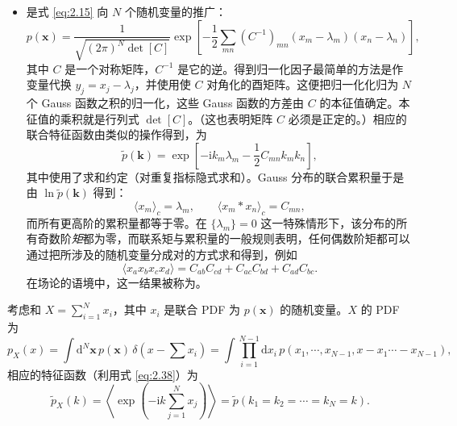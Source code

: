 \begin{itemize}[itemsep=0.45em,topsep=0.4em]
  \item {}是式 \eqref{eq:2.15} 向 $N$ 个随机变量的推广：
  \begin{equation}\label{eq:2.41}
    p(\bm{x})=\frac{1}{\sqrt{(2\pi)^N\det[C]}}\exp\left[-\frac{1}{2}\sum_{mn}\left(C^{-1}\right)_{mn}(x_m-\lambda_m)(x_n-\lambda_n)\right],
  \end{equation}
  其中 $C$ 是一个对称矩阵，$C^{-1}$ 是它的逆。得到归一化因子最简单的方法是作变量代换 $y_j=x_j-\lambda_j$，并使用使 $C$ 对角化的酉矩阵。这便把归一化化归为 $N$ 个 Gauss 函数之积的归一化，这些 Gauss 函数的方差由 $C$ 的本征值确定。本征值的乘积就是行列式 $\det[C]$。（这也表明矩阵 $C$ 必须是正定的。）相应的联合特征函数由类似的操作得到，为
  \begin{equation}\label{eq:2.42}
    \tilde p(\bm{k})=\exp\left[-\mathrm{i}k_m\lambda_m-\frac{1}{2}C_{mn}k_mk_n\right],
  \end{equation}
  其中使用了求和约定（对重复指标隐式求和）。Gauss 分布的联合累积量于是由 $\ln\tilde p(\bm{k})$ 得到：
  \begin{equation}\label{eq:2.43}
    \langle x_m\rangle_c=\lambda_m,\qquad \langle x_m*x_n\rangle_c=C_{mn},
  \end{equation}
  而所有更高阶的累积量都等于零。在 $\{\lambda_m\}=0$ 这一特殊情形下，该分布的所有奇数阶\emph{矩}都为零，而联系矩与累积量的一般规则表明，任何偶数阶矩都可以通过把所涉及的随机变量分成对的方式求和得到，例如
  \begin{equation}\label{eq:2.44}
    \langle x_ax_bx_cx_d\rangle=C_{ab}C_{cd}+C_{ac}C_{bd}+C_{ad}C_{bc}.
  \end{equation}
  在场论的语境中，这一结果被称为。
\end{itemize}


考虑和 $X=\sum_{i=1}^{N}x_i$，其中 $x_i$ 是联合 PDF 为 $p(\bm{x})$ 的随机变量。$X$ 的 PDF 为
\begin{equation}\label{eq:2.45}
  p_X(x)=\int\mathrm{d}^N\bm{x}\,p(\bm{x})\,\delta\!\left(x-\sum x_i\right)=\int\prod_{i=1}^{N-1}\mathrm{d}x_i\,p\left(x_1,\cdots,x_{N-1},x-x_1\cdots-x_{N-1}\right),
\end{equation}
相应的特征函数（利用式 \eqref{eq:2.38}）为
\begin{equation}\label{eq:2.46}
  \tilde p_X(k)=\left\langle\exp\left(-\mathrm{i}k\sum_{j=1}^{N}x_j\right)\right\rangle=\tilde p\left(k_1=k_2=\cdots=k_N=k\right).
\end{equation}

